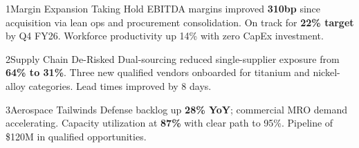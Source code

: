 \documentclass[10pt,letterpaper]{article}
\begin{document}
\begin{tcbraster}[raster columns=3, raster equal height,
                  raster column skip=6pt, raster force size=false]
\begin{insightbox}{1\enspace Margin Expansion Taking Hold}
  EBITDA margins improved \textbf{310bp} since acquisition via lean ops and
  procurement consolidation. On track for \textbf{22\% target} by Q4 FY26.
  Workforce productivity up 14\% with zero CapEx investment.
\end{insightbox}
\begin{insightbox}{2\enspace Supply Chain De-Risked}
  Dual-sourcing reduced single-supplier exposure from \textbf{64\% to 31\%}.
  Three new qualified vendors onboarded for titanium and nickel-alloy
  categories. Lead times improved by 8 days.
\end{insightbox}
\begin{insightbox}{3\enspace Aerospace Tailwinds}
  Defense backlog up \textbf{28\% YoY}; commercial MRO demand accelerating.
  Capacity utilization at \textbf{87\%} with clear path to 95\%.
  Pipeline of \$120M in qualified opportunities.
\end{insightbox}
\end{tcbraster}

\vspace{8pt}
\end{document}
